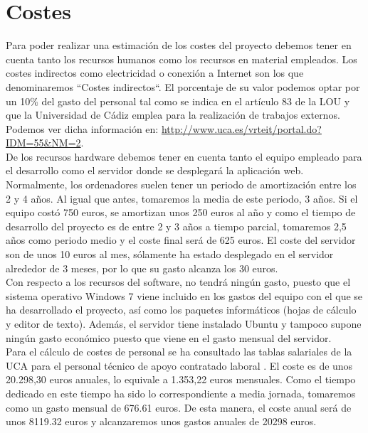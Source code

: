 \section{Costes}
Para poder realizar una estimación de los costes del proyecto debemos tener en cuenta tanto los recursos humanos como los recursos en material empleados. Los costes indirectos como electricidad o conexión a Internet son los que denominaremos ``Costes indirectos``. El porcentaje de su valor podemos optar por un 10\% del gasto del personal tal como se indica en el artículo 83 de la LOU y que la Universidad de Cádiz emplea para la realización de trabajos externos. Podemos ver dicha información en: \url{http://www.uca.es/vrteit/portal.do?IDM=55&NM=2}.\\

De los recursos hardware debemos tener en cuenta tanto el equipo empleado para el desarrollo como el servidor donde se desplegará la aplicación web. Normalmente, los ordenadores suelen tener un periodo de amortización entre los 2 y 4 años. Al igual que antes, tomaremos la media de este periodo, 3 años. Si el equipo costó 750 euros, se amortizan unos 250 euros al año y como el tiempo de desarrollo del proyecto es de entre 2 y 3 años a tiempo parcial, tomaremos 2,5 años como periodo medio y el coste final será de 625 euros. El coste del servidor son de unos 10 euros al mes, sólamente ha estado desplegado en el servidor alrededor de 3 meses, por lo que su gasto alcanza los 30 euros.\\

Con respecto a los recursos del software, no tendrá ningún gasto, puesto que el sistema operativo Windows 7 viene incluido en los gastos del equipo con el que se ha desarrollado el proyecto, así como los paquetes informáticos (hojas de cálculo y editor de texto). Además, el servidor tiene instalado Ubuntu y tampoco supone ningún gasto económico puesto que viene en el gasto mensual del servidor.\\

Para el cálculo de costes de personal se ha consultado las tablas salariales de la UCA para el personal técnico de apoyo contratado laboral \cite{paslaboral}. El coste es de unos 20.298,30 euros anuales, lo equivale a 1.353,22 euros mensuales. Como el tiempo dedicado en este tiempo ha sido lo correspondiente a media jornada, tomaremos como un gasto mensual de 676.61 euros. De esta manera, el coste anual será de unos 8119.32 euros y alcanzaremos unos gastos anuales de 20298 euros.\\

